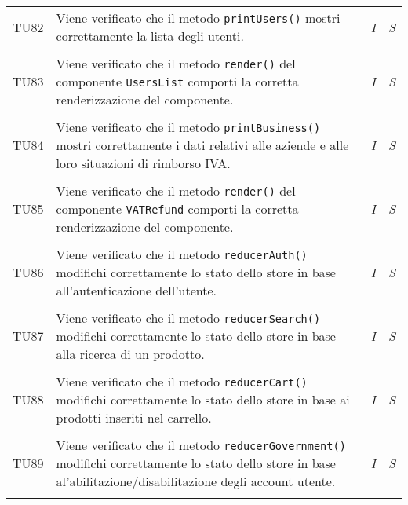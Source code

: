 \begin{longtable}{ >{\centering}p{} >{}p{}
				>{\centering}p{} >{\centering}p{}}
			\tabularnewline
			\hypertarget{TU82}{TU82} & Viene verificato che il metodo 
			\texttt{printUsers()} mostri correttamente la lista degli 
			utenti. & 
			\textit{I} & 
			\textit{S}\\
			
			\tabularnewline
			\hypertarget{TU83}{TU83} & Viene verificato che il metodo 
			\texttt{render()} del componente \texttt{UsersList} comporti la 
			corretta renderizzazione del componente. & 
			\textit{I} & 
			\textit{S}\\
			
			\tabularnewline
			\hypertarget{TU84}{TU84} & Viene verificato che il metodo 
			\texttt{printBusiness()} mostri correttamente i dati relativi 
			alle aziende e alle loro situazioni di rimborso IVA. & 
			\textit{I} & 
			\textit{S}\\

			\tabularnewline
			\hypertarget{TU85}{TU85} & Viene verificato che il metodo 
			\texttt{render()} del componente \texttt{VATRefund} comporti 
			la corretta renderizzazione del componente. & 
			\textit{I} & 
			\textit{S}\\
			
			\tabularnewline
			\hypertarget{TU86}{TU86} & Viene verificato che il metodo 
			\texttt{reducerAuth()} modifichi correttamente lo stato dello store 
			in base all'autenticazione dell'utente. & 
			\textit{I} & 
			\textit{S}\\
			
			\tabularnewline
			\hypertarget{TU87}{TU87} & Viene verificato che il metodo 
			\texttt{reducerSearch()} modifichi correttamente lo stato dello 
			store in base alla ricerca di un prodotto. & 
			\textit{I} & 
			\textit{S}\\
			
			\tabularnewline
			\hypertarget{TU88}{TU88} & Viene verificato che il metodo 
			\texttt{reducerCart()} modifichi correttamente lo stato dello store 
			in base ai prodotti inseriti nel carrello. & 
			\textit{I} & 
			\textit{S}\\
			
			\tabularnewline
			\hypertarget{TU89}{TU89} & Viene verificato che il metodo 
			\texttt{reducerGovernment()} modifichi correttamente lo stato dello 
			store in base al'abilitazione/disabilitazione degli account utente. & 
			\textit{I} & 
			\textit{S}\\
			

			\tabularnewline
		\end{longtable}


